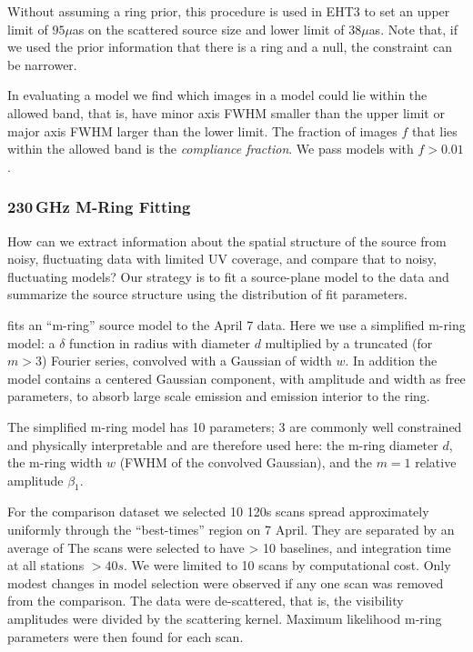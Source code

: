 Without assuming a ring prior, this procedure is used in EHT3  to set an upper limit of $95\mu$as on
the scattered source size and lower limit of $38\mu$as.
Note that, if we used the prior information that there is a ring and a null, the constraint can be narrower.

In evaluating a model we find which images in a model could lie within the allowed band, that is, have minor axis FWHM smaller than the upper limit or major axis FWHM larger than the lower limit.  The fraction of images $f$ that lies within the allowed band is the {\em compliance fraction}.  We pass models with $f > 0.01$.

\subsubsection{230\,GHz M-Ring Fitting}

How can we extract information about the spatial structure of the source from noisy, fluctuating data with limited UV coverage, and compare that to noisy, fluctuating models? Our strategy is to fit a source-plane model to the data and summarize the source structure using the distribution of fit parameters.  

 fits an ``m-ring'' source model to the April 7 data.  Here we use a simplified m-ring model: a $\delta$ function in radius with diameter $d$ multiplied by a truncated (for $m > 3$) Fourier series, convolved with a Gaussian of width $w$.  In addition the model contains a centered Gaussian component, with amplitude and width as free parameters, to absorb large scale emission and emission interior to the ring.

The simplified m-ring model has 10 parameters; 3 are commonly well constrained and physically interpretable and are therefore used here: the m-ring diameter $d$, the m-ring width $w$ (FWHM of the convolved Gaussian), and the $m=1$ relative amplitude $\beta_1$.

For the comparison dataset we selected 10 120s scans spread approximately uniformly through the ``best-times'' region on 7 April.  They are separated by an average of   The scans were selected to have > 10 baselines, and integration time at all stations $> 40s$.  We were limited to 10 scans by computational cost.   Only modest changes in model selection were observed if any one scan was removed from the comparison.  The data were de-scattered, that is, the visibility amplitudes were divided by the scattering kernel.  Maximum likelihood m-ring parameters were then found for each scan.  

